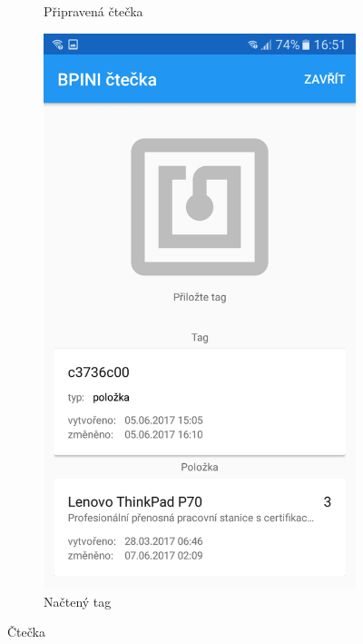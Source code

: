 \documentclass[czech,BP]{thesiskiv}
\begin{document}
\begin{figure}[H]
\begin{subfigure}[b]{0.3\textwidth}
	\caption{Připravená čtečka}
	\label{fig:Screenshot_20170607-165058}
  \end{subfigure}
  \begin{subfigure}[b]{0.3\textwidth}
    \centering
	\includegraphics[width=\textwidth]{../images/client_android/Screenshot_20170607-165117.png}	
	\caption{Načtený tag}
	\label{fig:Screenshot_20170607-165117}
  \end{subfigure}
  \caption{Čtečka}
\end{figure}
\end{document}
